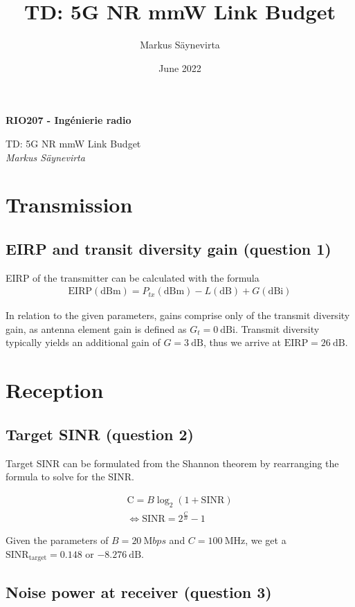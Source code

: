 \documentclass{article}
\title{TD: 5G NR mmW Link Budget}
\author{Markus Säynevirta}
\date{June 2022}
\begin{document}
\thispagestyle{plain}

\large
\textbf{RIO207 - Ingénierie radio}

\large
TD: 5G NR mmW Link Budget\\
\textit{Markus Säynevirta}
\vspace{0.5cm}

\section{Transmission}
\subsection{EIRP and transit diversity gain (question 1)}

EIRP of the transmitter can be calculated with the formula 
\begin{align*}
     \mathrm{EIRP(dBm)} = P_{tx}\mathrm{(dBm)} - L\mathrm{(dB)} + G\mathrm{(dBi)}
\end{align*}

In relation to the given parameters, gains comprise only of the transmit diversity gain, as antenna element gain is defined as \(G_t = 0\ \mathrm{dBi}\). Transmit diversity typically yields an additional gain of \(G =3\ \mathrm{dB}\), thus we arrive at \(\mathrm{EIRP} = 26\ \mathrm{dB}\).

\section{Reception}
\subsection{Target SINR (question 2)}

Target SINR can be formulated from the Shannon theorem by rearranging the formula to solve for the SINR.

\begin{gather*}
     \mathrm{C} = B\log_2 (1+\mathrm{SINR}) \\
     \Leftrightarrow \mathrm{SINR} = 2^{\frac{C}{B}} - 1
\end{gather*}

Given the parameters of \(B = \SI{20}{\mega bps}\) and \(C = \SI{100}{\mega\hertz}\), we get a \(\mathrm{SINR_{target}} = 0.148\) or \(\SI{-8.276}{\deci\bel}\).

\subsection{Noise power at receiver (question 3)}
\end{document}
